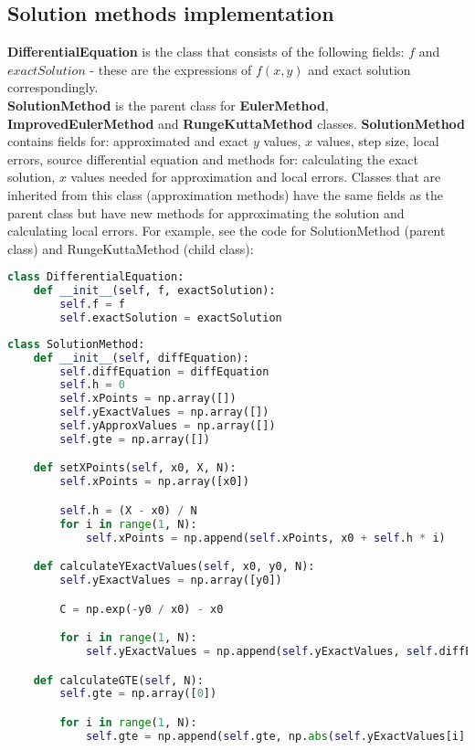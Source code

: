 \documentclass[12pt, a4paper]{article}
\begin{document}
    \subsection{Solution methods implementation}
        \textbf{DifferentialEquation} is the class that consists of the following fields: $f$ and $exactSolution$ - these are the expressions of $f(x, y)$ and exact solution correspondingly. \\
        \textbf{SolutionMethod} is the parent class for \textbf{EulerMethod}, \textbf{ImprovedEulerMethod} and \textbf{RungeKuttaMethod} classes. \textbf{SolutionMethod} contains fields for: approximated and exact $y$ values, $x$ values, step size, local errors, source differential equation and methods for: calculating the exact solution, $x$ values needed for approximation and local errors. Classes that are inherited from this class (approximation methods) have the same fields as the parent class but have new methods for approximating the solution and calculating local errors. For example, see the code for SolutionMethod (parent class) and RungeKuttaMethod (child class):
        
        \begin{lstlisting}[language=Python, caption=DifferentialEquation class]
class DifferentialEquation:
    def __init__(self, f, exactSolution):
        self.f = f
        self.exactSolution = exactSolution
    \end{lstlisting}
        
        \begin{lstlisting}[language=Python, caption=SolutionMethod class]
class SolutionMethod:
    def __init__(self, diffEquation):
        self.diffEquation = diffEquation
        self.h = 0
        self.xPoints = np.array([])
        self.yExactValues = np.array([])
        self.yApproxValues = np.array([])
        self.gte = np.array([])

    def setXPoints(self, x0, X, N):
        self.xPoints = np.array([x0])

        self.h = (X - x0) / N
        for i in range(1, N):
            self.xPoints = np.append(self.xPoints, x0 + self.h * i)

    def calculateYExactValues(self, x0, y0, N):
        self.yExactValues = np.array([y0])

        C = np.exp(-y0 / x0) - x0

        for i in range(1, N):
            self.yExactValues = np.append(self.yExactValues, self.diffEquation.exactSolution(self.xPoints[i], C))

    def calculateGTE(self, N):
        self.gte = np.array([0])

        for i in range(1, N):
            self.gte = np.append(self.gte, np.abs(self.yExactValues[i] - self.yApproxValues[i]))
    \end{lstlisting}
    
\end{document}
